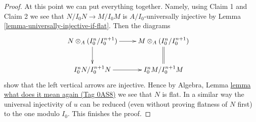 \documentclass{amsart}
\theoremstyle{plain}
\theoremstyle{definition}
\theoremstyle{remark}
\numberwithin{equation}{subsection}
\begin{document}
\begin{proof}
\medskip\noindent
At this point we can put everything together. Namely, using
Claim 1 and Claim 2 we see that $N/I_0 N \to M/I_0M$ is
$A/I_0$-universally injective by
Lemma \ref{lemma-universally-injective-if-flat}.
Then the diagrams
$$
\xymatrix{
N \otimes_A (I_0^n/I_0^{n + 1}) \ar[r] \ar[d] &
M \otimes_A (I_0^n/I_0^{n + 1}) \ar@{=}[d] \\
I_0^n N /I_0^{n + 1} N \ar[r] &
I_0^n M /I_0^{n + 1} M
}
$$
show that the left vertical arrows are injective. Hence by
Algebra, Lemma \href{https://stacks.math.columbia.edu/tag/0AS8}{lemma what does it mean again (Tag 0AS8)}
we see that $N$ is flat. In a similar way the
universal injectivity of $u$ can be reduced (even without
proving flatness of $N$ first) to the one modulo $I_0$. This finishes
the proof.
\end{proof}
\end{document}
